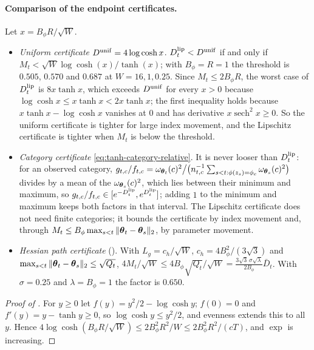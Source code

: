 \paragraph{Comparison of the endpoint certificates.}
Let $x=B_\phi R/\sqrt W$.
\begin{itemize}
\item \emph{Uniform certificate} $D^{\rm unif}=4\log\cosh x$.
$D_t^{\rm lip}<D^{\rm unif}$ if and only if
$M_t<\sqrt W\log\cosh(x)/\tanh(x)$; with $B_\phi=R=1$ the threshold is
$0.505$, $0.570$ and $0.687$ at $W=16,1,0.25$. Since $M_t\le2B_\phi R$, the
worst case of $D_t^{\rm lip}$ is $8x\tanh x$, which exceeds $D^{\rm unif}$ for
every $x>0$ because $\log\cosh x\le x\tanh x<2x\tanh x$; the first inequality
holds because $x\tanh x-\log\cosh x$ vanishes at $0$ and has derivative
$x\operatorname{sech}^2x\ge0$. So the uniform certificate is tighter for large
index movement, and the Lipschitz certificate is tighter when $M_t$ is below
the threshold.
\item \emph{Category certificate} \eqref{eq:tanh-category-relative}. It is
never looser than $D_t^{\rm lip}$: for an observed category,
$g_{t,c}/f_{t,c}=\omega_{\boldsymbol{\theta}_t}(c)^2\big/\big(n_{t,c}^{-1}
\sum_{s<t:\phi(z_s)=\phi_c}\omega_{\boldsymbol{\theta}_s}(c)^2\big)$ divides by a mean of
the $\omega_{\boldsymbol{\theta}_s}(c)^2$, which lies between their minimum and maximum,
so $g_{t,c}/f_{t,c}\in[e^{-D_t^{\rm lip}},e^{D_t^{\rm lip}}]$; adding $1$ to
the minimum and maximum keeps both factors in that interval. The Lipschitz
certificate does not need finite categories; it bounds the certificate by
index movement and, through $M_t\le B_\phi\max_{s<t}\|\boldsymbol{\theta}_t-\boldsymbol{\theta}_s\|_2$,
by parameter movement.
\item \emph{Hessian path certificate} (). With
$L_g=c_h/\sqrt W$, $c_h=4B_\phi^2/(3\sqrt3)$ and
$\max_{s<t}\|\boldsymbol{\theta}_t-\boldsymbol{\theta}_s\|_2\le\sqrt{Q_t}$,
$4M_t/\sqrt W\le4B_\phi\sqrt{Q_t}/\sqrt W
=\frac{3\sqrt3\,\sigma\sqrt\lambda}{2B_\phi}\bar D_t$. With $\sigma=0.25$ and
$\lambda=B_\phi=1$ the factor is $0.650$.
\end{itemize}

\begin{proof}[Proof of ]
For $y\ge0$ let $f(y)=y^2/2-\log\cosh y$; $f(0)=0$ and $f'(y)=y-\tanh y\ge0$,
so $\log\cosh y\le y^2/2$, and evenness extends this to all $y$. Hence
$4\log\cosh(B_\phi R/\sqrt W)\le2B_\phi^2R^2/W\le2B_\phi^2R^2/(cT)$, and
$\exp$ is increasing.
\end{proof}

